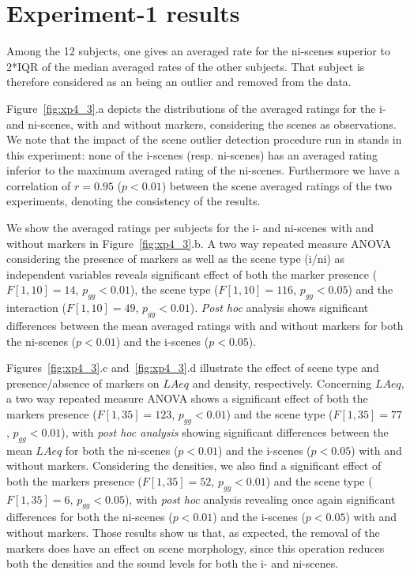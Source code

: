 \documentclass[twoside,twocolumn]{article}
\begin{document}
\section{Experiment-1 results}

Among the 12 subjects, one gives an averaged rate for the ni-scenes superior to 2*IQR of the median averaged rates of the other subjects. That subject is therefore considered as an being an outlier and  removed from the data.

Figure~\ref{fig:xp4_3}.a depicts the distributions of the averaged ratings for the i- and ni-scenes, with and without markers, considering the scenes as observations. We note that the impact of the scene outlier detection procedure run in \cite{lafayPartI} stands in this experiment: none of the i-scenes (resp. ni-scenes) has an averaged rating inferior to the maximum averaged rating of the ni-scenes. Furthermore we have a correlation of $r=0.95$ ($p<0.01$) between the scene averaged ratings of the two experiments, denoting  the consistency of the results.

We show the averaged ratings per subjects for the i- and ni-scenes with and without markers in Figure~\ref{fig:xp4_3}.b. A two way repeated measure ANOVA considering the presence of markers as well as the scene type (i/ni) as independent variables reveals significant effect of both the marker presence ($F[1,10]=14$, $p_{gg}<0.01$), the scene type ($F[1,10]=116$, $p_{gg}<0.05$) and the interaction ($F[1,10]=49$, $p_{gg}<0.01$). \emph{Post hoc} analysis shows significant differences between the mean averaged ratings with and without markers for both the ni-scenes ($p<0.01$) and  the i-scenes ($p<0.05$). 

Figures~\ref{fig:xp4_3}.c and~\ref{fig:xp4_3}.d illustrate the effect of scene type and presence/absence of markers on $LAeq$ and density, respectively. Concerning $LAeq$, a two way repeated measure ANOVA shows a significant effect of both the markers presence ($F[1,35]=123$, $p_{gg}<0.01$) and the scene type ($F[1,35]=77$, $p_{gg}<0.01$), with \emph{post hoc analysis} showing significant differences between the mean $LAeq$ for both the ni-scenes ($p<0.01$) and the i-scenes ($p<0.05$) with and without markers. Considering the densities, we also find a significant effect of both the markers presence ($F[1,35]=52$, $p_{gg}<0.01$) and the scene type ($F[1,35]=6$, $p_{gg}<0.05$), with \emph{post hoc} analysis revealing once again significant differences for both the ni-scenes  ($p<0.01$) and the i-scenes ($p<0.05$) with and without markers. Those results show us that, as expected, the removal of the markers does have an effect on scene morphology, since this operation reduces both the densities and the sound levels for both the i- and ni-scenes.
\end{document}
